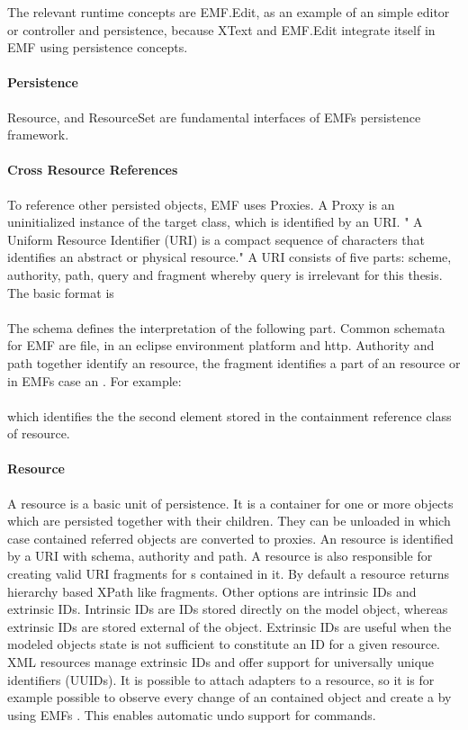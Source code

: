 The relevant runtime concepts are EMF.Edit, as an example of an simple editor or controller and persistence, because XText \cite{XTextMan} and EMF.Edit integrate itself in EMF using persistence concepts.

\paragraph{Persistence}
Resource, and ResourceSet are fundamental interfaces of EMFs persistence framework.


\paragraph{Cross Resource References}
To reference other persisted objects, EMF uses Proxies. A Proxy is an uninitialized instance of the target class, which is identified by an URI. " A Uniform Resource Identifier (URI) is a compact sequence of characters that identifies an abstract or physical resource." \cite{URI} A URI consists of five parts: scheme, authority, path, query and fragment whereby query is irrelevant for this thesis. The basic format is\\
 \\
The schema defines the interpretation of the following part. Common schemata for EMF are file, in an eclipse environment platform and http. Authority and path together identify an resource, the fragment identifies a part of an resource or in EMFs case an .
For example:\\
\\
which identifies the the second element stored in the containment reference class of  resource.


\paragraph{Resource}
A resource is a basic unit of persistence. It is a container for one or more objects which are persisted together with their children. They can be unloaded in which case contained referred objects  are converted to proxies. An resource is identified by a URI with schema, authority and path. A resource is also responsible for creating valid URI fragments for s contained in it. By default a resource returns hierarchy based XPath like fragments. Other options are intrinsic IDs and extrinsic IDs. Intrinsic IDs are IDs stored directly on the model object, whereas extrinsic IDs are stored external of the object. Extrinsic IDs are useful when the modeled objects state is not sufficient to constitute an ID for a given resource. XML resources manage extrinsic IDs and offer support for universally unique identifiers (UUIDs). It is possible to attach adapters to a resource, so it is for example possible to observe every change of an contained object and create a  by using EMFs . This enables automatic undo support for commands. \cite{EMF2nd}

